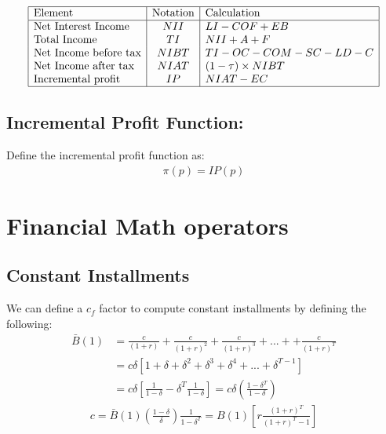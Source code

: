 \renewcommand{\arraystretch}{1.5} %
\begin{center} %
\[ %
\begin{array}{|l|c|l|} \hline %
\mbox{Element} & \mbox{Notation} & \mbox{Calculation}\\ \hline
\mbox{Net Interest Income }  & NII & LI-COF+EB\\
\mbox{Total Income  }  & TI & NII+A+F\\
\mbox{Net Income before tax}  & NIBT & TI-OC-COM-SC-LD-C\\
\mbox{Net Income after tax }  & NIAT&(1-\tau)\times NIBT \\
\mbox{Incremental profit  }  & IP & NIAT-EC\\

\hline
\end{array} %
\] %
\end{center}

\subsection{ Incremental Profit Function: }
Define the incremental profit function as:
\begin{align}
\pi(p)=IP(p)
\end{align}
\section{Financial Math operators}
\subsection{Constant Installments}
We can define a $c_f$ factor to compute constant installments by defining the following:
\begin{align}
    \bar{B}(1) &= \frac{c}{(1+r)}+\frac{c}{(1+r)^2}+\frac{c}{(1+r)^3}+...++\frac{c}{(1+r)^T} \nonumber\\
    &=c\delta[1+\delta+\delta^2+\delta^3+\delta^4+...+\delta^{T-1}] \nonumber \\
    &=c\delta\left[\frac{1}{1-\delta}-\delta^T\frac{1}{1-\delta}\right] =c\delta\left(\frac{1-\delta^T}{1-\delta}\right)
\end{align}
\begin{align}
    c=\bar{B}(1)\left(\frac{1-\delta}{\delta}\right)\frac{1}{1-\delta^T}=B(1)\left[r\frac{(1+r)^T}{(1+r)^T-1}\right]
\end{align}

